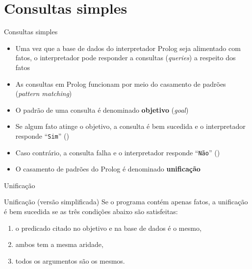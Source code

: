 \section{Consultas simples}

\begin{frame}[fragile]{Consultas simples}

    \begin{itemize}
        \item Uma vez que a base de dados do interpretador Prolog seja alimentado com fatos, o
            interpretador pode responder a consultas (\textit{queries}) a respeito dos
            fatos

        \item As consultas em Prolog funcionam por meio do casamento de padrões
            (\textit{pattern matching})

        \item O padrão de uma consulta é denominado \textbf{objetivo} (\textit{goal})

        \item Se algum fato atinge o objetivo, a consulta é bem sucedida e o interpretador
            responde ``\texttt{Sim}'' ()

        \item Caso contrário, a consulta falha e o interpretador responde ``\texttt{Não}''
            ()

        \item O casamento de padrões do Prolog é denominado \textbf{unificação}

    \end{itemize}

\end{frame}

\begin{frame}[fragile]{Unificação}

    \begin{block}{Unificação (versão simplificada)}
        Se o programa contém apenas fatos, a unificação é bem sucedida se as três condições
            abaixo são satisfeitas:
        \begin{enumerate}
            \item o predicado citado no objetivo e na base de dados é o mesmo,
            \item ambos tem a mesma aridade,
            \item todos os argumentos são os mesmos.
        \end{enumerate}

    \end{block}

\end{frame}

